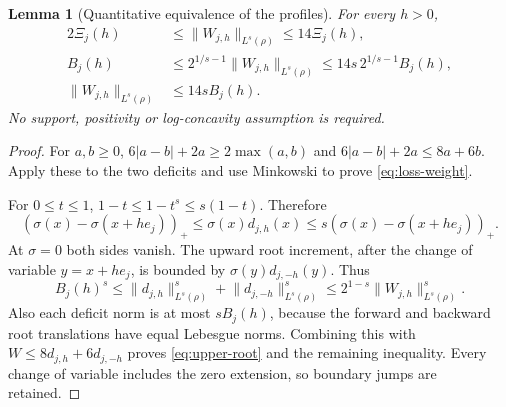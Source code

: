 \documentclass[11pt]{article}
\newtheorem{lemma}[theorem]{Lemma}
\theoremstyle{remark}\newtheorem{remark}[theorem]{Remark}
\newcommand{\norm}[1]{\lVert#1\rVert}
\begin{document}
\begin{lemma}[Quantitative equivalence of the profiles]\label{lem:profiles}
For every $h>0$,
\begin{align}
 2\Xi_j(h)&\le\norm{W_{j,h}}_{L^s(\rho)}\le14\Xi_j(h),\label{eq:loss-weight}\\
 B_j(h)&\le2^{1/s-1}\norm{W_{j,h}}_{L^s(\rho)}
          \le14s\,2^{1/s-1}B_j(h),\label{eq:root-weight}\\
 \norm{W_{j,h}}_{L^s(\rho)}&\le14s B_j(h).\label{eq:upper-root}
\end{align}
No support, positivity or log-concavity assumption is required.
\end{lemma}
\begin{proof}
For $a,b\ge0$, $6|a-b|+2a\ge2\max(a,b)$ and
$6|a-b|+2a\le8a+6b$. Apply these to the two deficits and use Minkowski to prove \eqref{eq:loss-weight}.

For $0\le t\le1$, $1-t\le1-t^s\le s(1-t)$. Therefore
\[
 (\sigma(x)-\sigma(x+he_j))_+
 \le\sigma(x)d_{j,h}(x)
 \le s(\sigma(x)-\sigma(x+he_j))_+.
\]
At $\sigma=0$ both sides vanish. The upward root increment, after the change of variable $y=x+he_j$, is bounded by $\sigma(y)d_{j,-h}(y)$. Thus
\[
 B_j(h)^s\le\norm{d_{j,h}}_{L^s(\rho)}^s+
                    \norm{d_{j,-h}}_{L^s(\rho)}^s
 \le2^{1-s}\norm{W_{j,h}}_{L^s(\rho)}^s.
\]
Also each deficit norm is at most $s B_j(h)$, because the forward and backward root translations have equal Lebesgue norms. Combining this with $W\le8d_{j,h}+6d_{j,-h}$ proves \eqref{eq:upper-root} and the remaining inequality. Every change of variable includes the zero extension, so boundary jumps are retained.
\end{proof}
\end{document}
